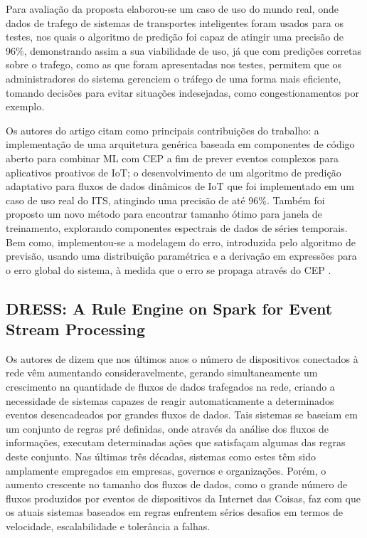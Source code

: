 \documentclass[ti,table]{texufpel} %
\begin{document}
      

     Para avaliação da proposta elaborou-se um caso de uso do mundo real, onde dados de trafego de sistemas de transportes inteligentes foram usados para os testes, nos quais o algoritmo de predição foi capaz de atingir uma precisão de 96\%, demonstrando assim a sua viabilidade de uso, já que com predições corretas sobre o trafego, como as que foram apresentadas nos testes, permitem que os administradores do sistema gerenciem o tráfego de uma forma mais eficiente, tomando decisões para evitar situações indesejadas, como congestionamentos por exemplo.      

     Os autores do artigo citam como principais contribuições do trabalho: a implementação de uma arquitetura genérica baseada em componentes de código aberto para combinar ML com CEP a fim de prever eventos complexos para aplicativos proativos de IoT; o desenvolvimento de um algoritmo de predição adaptativo para fluxos de dados dinâmicos de IoT que foi implementado em um caso de uso real do ITS, atingindo uma precisão de até 96\%. Também foi proposto um novo método para encontrar tamanho ótimo para janela de treinamento, explorando componentes espectrais de dados de séries temporais. Bem como, implementou-se a modelagem do erro, introduzida pelo algoritmo de previsão, usando uma distribuição paramétrica e a derivação em expressões para o erro global do sistema, à medida que o erro se propaga através do CEP \cite{art4akbar2017predictive}. 

  

  

  

\subsection{DRESS: A Rule Engine on Spark for Event Stream Processing} 

  

  

    Os autores de \cite{art5chen2016dress} dizem que nos últimos anos o número de dispositivos conectados à rede vêm aumentando consideravelmente, gerando simultaneamente um crescimento na quantidade de fluxos de dados trafegados na rede, criando a necessidade de sistemas capazes de reagir automaticamente a determinados eventos desencadeados por grandes fluxos de dados. Tais sistemas se baseiam em um conjunto de regras pré definidas, onde através da análise dos fluxos de informações, executam determinadas ações que satisfaçam algumas das regras deste conjunto. Nas últimas três décadas, sistemas como estes têm sido amplamente empregados em empresas, governos e organizações. Porém, o aumento crescente no tamanho dos fluxos de dados, como o grande número de fluxos produzidos por eventos de dispositivos da Internet das Coisas, faz com que os atuais sistemas baseados em regras enfrentem sérios desafios em termos de velocidade, escalabilidade e tolerância a falhas. 
\end{document}
